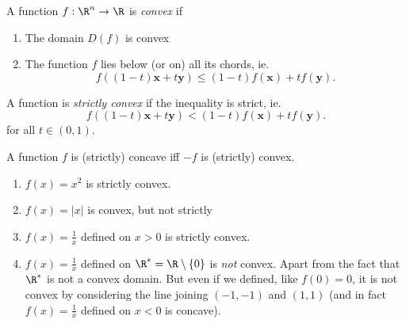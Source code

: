 \documentclass[a4paper]{article}
\begin{document}
\begin{defi}
  A function $f: \R^n \to \R$ is \emph{convex} if
  \begin{enumerate}
    \item The domain $D(f)$ is convex
    \item The function $f$ lies below (or on) all its chords, ie.
      \[
        f((1 - t)\mathbf{x} + t\mathbf{y}) \leq (1 - t)f(\mathbf{x}) + tf(\mathbf{y}). \tag{$*$}
      \]
  \end{enumerate}
  A function is \emph{strictly convex} if the inequality is strict, ie.
  \[
    f((1 - t)\mathbf{x} + t\mathbf{y}) < (1 - t)f(\mathbf{x}) + tf(\mathbf{y}).
  \]
  for all $t\in (0, 1)$.
  \begin{center}
  \end{center}

  A function $f$ is (strictly) concave iff $-f$ is (strictly) convex.
\end{defi}

\begin{eg}\leavevmode
  \begin{enumerate}
    \item $f(x) = x^2$ is strictly convex.
    \item $f(x) = |x|$ is convex, but not strictly
    \item $f(x) = \frac{1}{x}$ defined on $x > 0$ is strictly convex.
    \item $f(x) = \frac{1}{x}$ defined on $\R^* = \R \setminus \{0\}$ is \emph{not} convex. Apart from the fact that $\R^*$ is not a convex domain. But even if we defined, like $f(0) = 0$, it is not convex by considering the line joining $(-1, -1)$ and $(1, 1)$ (and in fact $f(x) = \frac{1}{x}$ defined on $x < 0$ is concave).
  \end{enumerate}
\end{eg}
\end{document}

